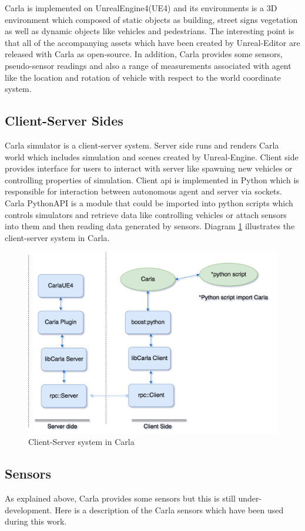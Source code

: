 Carla is implemented on UnrealEngine4(UE4) and its environments is a 3D environment which composed of static objects as building, street signs vegetation as well as dynamic objects like vehicles and pedestrians. The interesting point is that all of the accompanying assets which have been created by Unreal-Editor are released with Carla as open-source. In addition, Carla provides some sensors, pseudo-sensor readings and also a range of measurements associated with agent like the location and rotation of vehicle with respect to the world coordinate system. 
\subsection{Client-Server Sides}
Carla simulator is a client-server system. Server side runs and renders Carla world which includes simulation and scenes created by Unreal-Engine. Client side provides interface for users to interact with server like spawning new vehicles or controlling properties of simulation. Client \acrshort{api} is implemented in Python which is responsible for interaction between autonomous agent and server via sockets. Carla PythonAPI is a module that could be imported into python scripts which controls simulators and retrieve data like controlling vehicles or attach sensors into them and then reading data generated by sensors. Diagram \ref{fig:carlaModel} illustrates the client-server system in Carla.  
\begin{figure}
    \centering
    \includegraphics[width=12cm]{images/carlaModel.jpg}
    \caption{Client-Server system in Carla}
    \label{fig:carlaModel}
\end{figure}
\subsection{Sensors}
As explained above, Carla provides some sensors but this is still under-development. Here is a description of the Carla sensors which have been used during this work.
